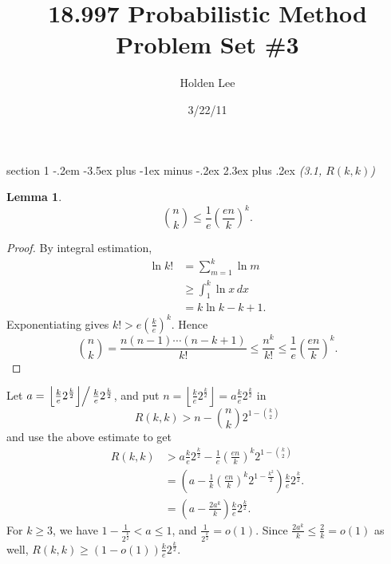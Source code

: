 \documentclass[12pt]{article}
\makeatletter
\theoremstyle{norm}
\newtheorem{lem}[thm]{Lemma}
\newcommand{\rc}[1]{\frac{1}{#1}}
\newcommand{\pa}[1]{\left( {#1} \right)}
\newcommand{\fl}[1]{\left\lfloor {#1}\right\rfloor}
\newcommand{\pf}[2]{\pa{\frac{#1}{#2}}}
\newenvironment{problem}{\@startsection
       {section}
       {1}
       {-.2em}
       {-3.5ex plus -1ex minus -.2ex}
       {2.3ex plus .2ex}
       {\pagebreak[3]%
       \large\bf\noindent{Problem }
       }
       }
       {%
       }
\makeatother
\begin{document}
\title{18.997 Probabilistic Method Problem Set \#3}%
\author{Holden Lee}
\date{3/22/11}%
\maketitle
\thispagestyle{empty}
\begin{problem}{\it (3.1, $R(k,k)$)}
\begin{lem}\label{binomest}
\[
\binom nk \le \rc e\pf{en}{k}^k.
\]
\end{lem}
\begin{proof}
By integral estimation,
\begin{align*}
\ln k!&=\sum_{m=1}^k \ln m\\
&\ge \int_{1}^k\ln x\,dx\\
&=k\ln k-k+1.
\end{align*}
Exponentiating gives $k!>e\pf ke^k$. Hence
\[
\binom nk=\frac{n(n-1)\cdots (n-k+1)}{k!}\le\frac{n^k}{k!}\le \rc e\pf{en}{k}^k.
\]
\end{proof}

Let $a=\left.\fl{\frac ke2^{\frac k2}}\right/\frac ke2^{\frac k2}$, and 
put $n=\fl{\frac ke2^{\frac k2}}=a\frac ke2^{\frac k2}$ in
\[
R(k,k)> n-\binom nk 2^{1-\binom k2}
\]
and use the above estimate to get
\begin{align*}
R(k,k)&>a\frac ke 2^{\frac k2}-\rc e\pf{en}{k}^k 2^{1-\binom k2}\\
&=\pa{a-\rc k\pf{en}{k}^k 2^{1-\frac{k^2}{2}}}\frac ke 2^{\frac k2}.\\
&=\pa{a-\frac {2a^k}k}\frac ke 2^{\frac k2}.
\end{align*}
For $k\ge 3$, we have $1-\frac{1}{2^{\frac k2}}<a\le 1$, and $\frac{1}{2^{\frac k2}}=o(1)$. Since $\frac {2a^k}k\le \frac{2}{k}=o(1)$ as well,  %
$R(k,k)\ge (1-o(1))\frac ke 2^{\frac k2}$.
\end{problem}
\end{document}
